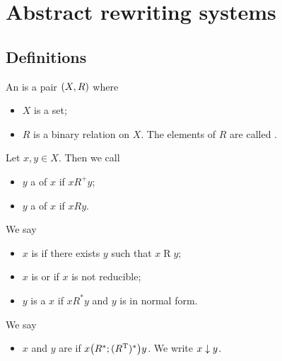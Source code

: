 \chapter{Abstract rewriting systems}
\section{Definitions}
\begin{definition}
An  is a pair $\left( X, R \right)$ where
\begin{itemize}
\item $X$ is a set;
\item $R$ is a binary relation on $X$. The elements of $R$ are called .
\end{itemize}
Let $x,y\in X$. Then we call
\begin{itemize}
\item $y$ a  of $x$ if $xR^+y$;
\item $y$ a  of $x$ if $xRy$.
\end{itemize}
We say
\begin{itemize}
\item $x$ is  if there exists $y$ such that $x\mathrel{R}y$;
\item $x$ is  or  if $x$ is not reducible;
\item $y$ is a  $x$ if $xR^*y$ and $y$ is in normal form.
\end{itemize}
We say
\begin{itemize}
\item $x$ and $y$ are  if $x\big(R^*;(R^{\mathrm{T}})^*\big)y$. We write $x \mathrel{\downarrow} y$.
\end{itemize}
\end{definition}

